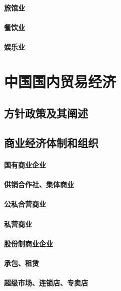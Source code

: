 \documentclass[UTF8]{../../RepresentationUniverse}
\begin{document}
    \subsubsection{旅馆业}
    \subsubsection{餐饮业}
    \subsubsection{娱乐业}






\chapter{中国国内贸易经济}
\section{方针政策及其阐述}
\section{商业经济体制和组织}
    \subsubsection{国有商业企业}
    \subsubsection{供销合作社、集体商业}
    \subsubsection{公私合营商业}
    \subsubsection{私营商业}
    \subsubsection{股份制商业企业}
    \subsubsection{承包、租赁}
    \subsubsection{超级市场、连锁店、专卖店}
\end{document}
